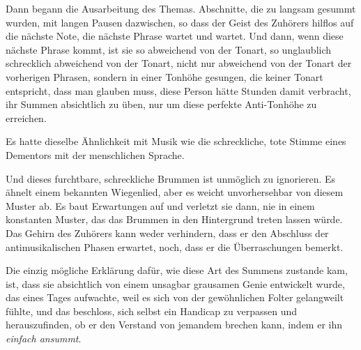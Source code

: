 Dann begann die Ausarbeitung des Themas. Abschnitte, die zu langsam gesummt wurden, mit langen Pausen dazwischen, so dass der Geist des Zuhörers hilflos auf die nächste Note, die nächste Phrase wartet und wartet. Und dann, wenn diese nächste Phrase kommt, ist sie so abweichend von der Tonart, so unglaublich schrecklich abweichend von der Tonart, nicht nur abweichend von der Tonart der vorherigen Phrasen, sondern in einer Tonhöhe gesungen, die keiner Tonart entspricht, dass man glauben muss, diese Person hätte Stunden damit verbracht, ihr Summen absichtlich zu üben, nur um diese perfekte Anti-Tonhöhe zu erreichen.

Es hatte dieselbe Ähnlichkeit mit Musik wie die schreckliche, tote Stimme eines Dementors mit der menschlichen Sprache.

Und dieses furchtbare, schreckliche Brummen ist unmöglich zu ignorieren. Es ähnelt einem bekannten Wiegenlied, aber es weicht unvorhersehbar von diesem Muster ab. Es baut Erwartungen auf und verletzt sie dann, nie in einem konstanten Muster, das das Brummen in den Hintergrund treten lassen würde. Das Gehirn des Zuhörers kann weder verhindern, dass er den Abschluss der antimusikalischen Phasen erwartet, noch, dass er die Überraschungen bemerkt.

Die einzig mögliche Erklärung dafür, wie diese Art des Summens zustande kam, ist, dass sie absichtlich von einem unsagbar grausamen Genie entwickelt wurde, das eines Tages aufwachte, weil es sich von der gewöhnlichen Folter gelangweilt fühlte, und das beschloss, sich selbst ein Handicap zu verpassen und herauszufinden, ob er den Verstand von jemandem brechen kann, indem er ihn \emph{einfach ansummt}.

